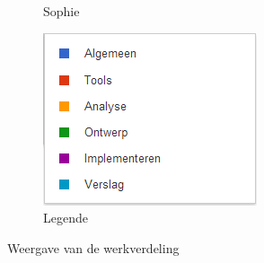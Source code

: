 \documentclass[i1]{oss}
\begin{document}
\begin{figure}[h!]
\begin{subfigure}[hb]{0.20\textwidth}
                \caption{Sophie}
        \end{subfigure}%
                \begin{subfigure}[hb]{0.20\textwidth}
                \centering
                \includegraphics[width=\textwidth]{legende}
                \caption{Legende}
        \end{subfigure}%


 \caption{Weergave van de werkverdeling}
\label{fig:werkverdeling}
\end{figure}

\newpage
\end{document}
